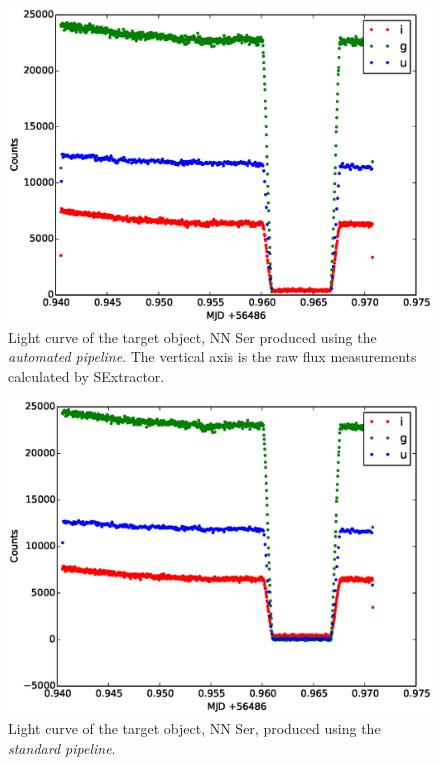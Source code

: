\begin{figure}
\centering
\includegraphics[width=140mm]{images/nnser_lightcurve_automated.eps}
\caption{Light curve of the target object, NN Ser produced using the \emph{automated pipeline}. The vertical axis is the raw flux measurements calculated by SExtractor.}
\label{fig:nnserlightcurveautomated}
\end{figure}

\begin{figure}
\centering
\includegraphics[width=140mm]{images/nnser_lightcurve_tom.eps}
\caption{Light curve of the target object, NN Ser, produced using the \emph{standard pipeline}. }
\label{fig:nnserlightcurvetom}
\end{figure}

